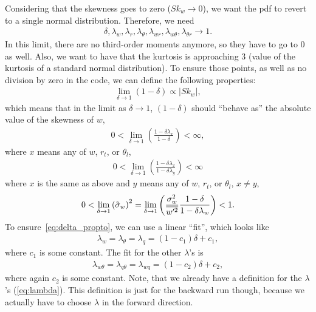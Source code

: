 Considering that the skewness goes to zero ($Sk_w \to 0$),
we want the \gls{pdf} to revert to a single normal distribution.
Therefore, we need
\begin{align}
    \delta, \lambda_w, \lambda_r, \lambda_\theta,
    \lambda_{w r}, \lambda_{w \theta}, \lambda_{\theta r}
    \to 1.
\end{align}
In this limit, there are no third-order moments anymore, so they have to go to 0 as well.
Also, we want to have that the kurtosis is approaching 3 (value of the kurtosis of a standard normal distribution).
To ensure those points, as well as no division by zero in the code, we can define the following properties:
\begin{align}
    \label{eq:delta_propto}
    \lim_{\delta \to 1} (1-\delta) \propto |Sk_w|,
\end{align}
which means that in the limit as $\delta \to 1$,
$(1-\delta)$ should \enquote{behave as} the absolute value of the skewness of $w$,
\begin{align}
    0 < \lim_{\delta\to 1} \left(\frac{1-\delta\lambda_x}{1-\delta}\right) < \infty,
\end{align}
where $x$ means any of $w$, $r_t$, or $\theta_l$,
\begin{align}
    0 < \lim_{\delta\to 1} \left(\frac{1-\delta\lambda_x}{1-\delta\lambda_y}\right) < \infty
\end{align}
where $x$ is the same as above and $y$ means any of $w$, $r_t$, or $\theta_l$, $x \neq y$,
\begin{align}
    0 < \lim_{\delta \to 1} \left({\tilde{\sigma}_w}\right)^2
    = \lim_{\delta \to 1} \left(\frac{\sigma_w^2}{\overline{w'^2}} \frac{1-\delta}{1-\delta \lambda_w}\right) < 1.
\end{align}
To ensure~\cref{eq:delta_propto}, we can use a linear \enquote{fit}, which looks like
\begin{align}
    \label{eq:lambda_fit}
    \lambda_w = \lambda_\theta = \lambda_q
    = (1 - c_1) \delta + c_1,
\end{align}
where $c_1$ is some constant.
The fit for the other $\lambda$'s is
\begin{align}
    \label{eq:lambda_xy_fit}
    \lambda_{w\theta} = \lambda_{q\theta} = \lambda_{wq}
    = (1 - c_2) \delta + c_2,
\end{align}
where again $c_2$ is some constant.
Note, that we already have a definition for the $\lambda$'s (\cref{eq:lambda}).
This definition is just for the backward run though,
because we actually have to choose $\lambda$ in the forward direction.

